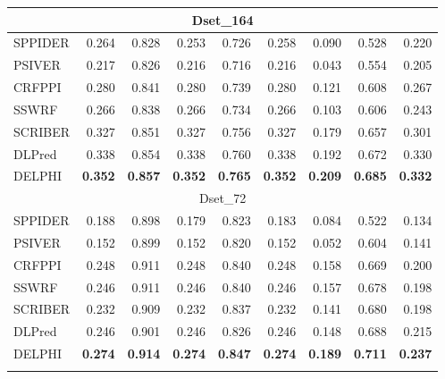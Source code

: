 \documentclass{bioinfo}
\begin{document}
\begin{table}[H]
\begin{tabular}{@{}l@{\ }*{8}{r}}
    \hline
    \multicolumn{9}{c}{Dset\_164} \\
    \hline
    SPPIDER & 0.264 & 0.828 & 0.253 & 0.726 & 0.258 & 0.090 & 0.528 & 0.220 \\
    PSIVER & 0.217 & 0.826 & 0.216 & 0.716 & 0.216 & 0.043 & 0.554 & 0.205 \\
    CRFPPI & 0.280 & 0.841 & 0.280 & 0.739 & 0.280 & 0.121 & 0.608 & 0.267 \\
    SSWRF & 0.266 & 0.838 & 0.266 & 0.734 & 0.266 & 0.103 & 0.606 & 0.243 \\
    SCRIBER & 0.327 & 0.851 & 0.327 & 0.756 & 0.327 & 0.179 & 0.657 & 0.301 \\
    DLPred & 0.338 & 0.854 & 0.338 & 0.760 & 0.338 & 0.192 & 0.672 & 0.330 \\
    DELPHI & \textbf{0.352} & \textbf{0.857} & \textbf{0.352} & \textbf{0.765} & \textbf{0.352} & \textbf{0.209} & \textbf{0.685} & \textbf{0.332} \\
    \hline
    \multicolumn{9}{c}{Dset\_72} \\
    \hline
    SPPIDER & 0.188 & 0.898 & 0.179 & 0.823 & 0.183 & 0.084 & 0.522 & 0.134 \\
    PSIVER & 0.152 & 0.899 & 0.152 & 0.820 & 0.152 & 0.052 & 0.604 & 0.141 \\
    CRFPPI & 0.248 & 0.911 & 0.248 & 0.840 & 0.248 & 0.158 & 0.669 & 0.200 \\
    SSWRF & 0.246 & 0.911 & 0.246 & 0.840 & 0.246 & 0.157 & 0.678 & 0.198 \\
    SCRIBER & 0.232 & 0.909 & 0.232 & 0.837 & 0.232 & 0.141 & 0.680 & 0.198 \\
    DLPred & 0.246 & 0.901 & 0.246 & 0.826 & 0.246 & 0.148 & 0.688 & 0.215 \\
    DELPHI & \textbf{0.274} & \textbf{0.914} & \textbf{0.274} & \textbf{0.847} & \textbf{0.274} & \textbf{0.189} & \textbf{0.711} & \textbf{0.237} \\
\label{tab_ds186_164_72}
    \end{tabular}%
\end{table}%
\end{document}
